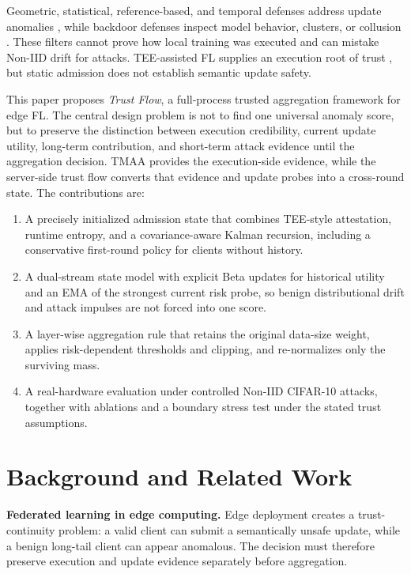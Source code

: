 \documentclass[runningheads,orivec]{llncs}
\newenvironment{tightenumerate}{%
    \begin{enumerate}\setlength{\itemsep}{1pt}\setlength{\parskip}{0pt}\setlength{\parsep}{0pt}}{\end{enumerate}}
\begin{document}
Geometric, statistical, reference-based, and temporal defenses address update anomalies \cite{blanchard2017krum,yin2018byzantine,cao2021fltrust,fung2020foolsgold,fldetector2022}, while backdoor defenses inspect model behavior, clusters, or collusion \cite{deepsight2022,flame2022,crowdguard2024,roseagg}. These filters cannot prove how local training was executed and can mistake Non-IID drift for attacks. TEE-assisted FL supplies an execution root of trust \cite{r1_tee_integrity,xu2021distributed,r5_tee_mitigating,lu2025tmt}, but static admission does not establish semantic update safety.

This paper proposes \emph{Trust Flow}, a full-process trusted aggregation framework for edge FL. The central design problem is not to find one universal anomaly score, but to preserve the distinction between execution credibility, current update utility, long-term contribution, and short-term attack evidence until the aggregation decision. TMAA provides the execution-side evidence, while the server-side trust flow converts that evidence and update probes into a cross-round state. The contributions are:
\begin{tightenumerate}
    \item A precisely initialized admission state that combines TEE-style attestation, runtime entropy, and a covariance-aware Kalman recursion, including a conservative first-round policy for clients without history.
    \item A dual-stream state model with explicit Beta updates for historical utility and an EMA of the strongest current risk probe, so benign distributional drift and attack impulses are not forced into one score.
    \item A layer-wise aggregation rule that retains the original data-size weight, applies risk-dependent thresholds and clipping, and re-normalizes only the surviving mass.
    \item A real-hardware evaluation under controlled Non-IID CIFAR-10 attacks, together with ablations and a boundary stress test under the stated trust assumptions.
\end{tightenumerate}

\section{Background and Related Work}

\textbf{Federated learning in edge computing.} Edge deployment creates a trust-continuity problem: a valid client can submit a semantically unsafe update, while a benign long-tail client can appear anomalous. The decision must therefore preserve execution and update evidence separately before aggregation.
\end{document}
